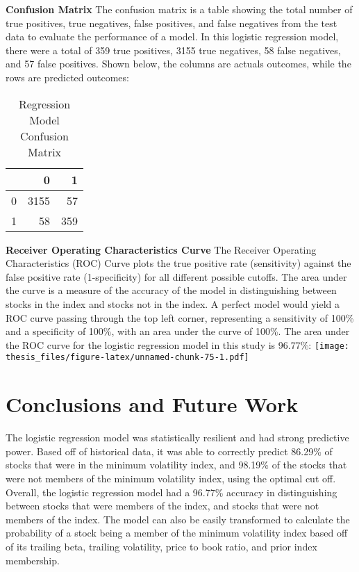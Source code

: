 \documentclass[12pt,twoside]{reedthesis}
\theoremstyle{definition}
\theoremstyle{definition}
\theoremstyle{definition}
\theoremstyle{remark}
\begin{document}
\hfill\break
\textbf{Confusion Matrix} \hfill\break
The confusion matrix is a table showing the total number of true
positives, true negatives, false positives, and false negatives from the
test data to evaluate the performance of a model. In this logistic
regression model, there were a total of 359 true positives, 3155 true
negatives, 58 false negatives, and 57 false positives. Shown below, the
columns are actuals outcomes, while the rows are predicted outcomes:
\begin{longtable}[t]{lrr}
\caption{\label{tab:unnamed-chunk-74}Regression Model Confusion Matrix}\\
\toprule
  & 0 & 1\\
\midrule
0 & 3155 & 57\\
1 & 58 & 359\\
\bottomrule
\end{longtable}
\hfill\break
\textbf{Receiver Operating Characteristics Curve} \hfill\break
The Receiver Operating Characteristics (ROC) Curve plots the true
positive rate (sensitivity) against the false positive rate
(1-specificity) for all different possible cutoffs. The area under the
curve is a measure of the accuracy of the model in distinguishing
between stocks in the index and stocks not in the index. A perfect model
would yield a ROC curve passing through the top left corner,
representing a sensitivity of 100\% and a specificity of 100\%, with an
area under the curve of 100\%. The area under the ROC curve for the
logistic regression model in this study is 96.77\%:
\texttt{[image: thesis\_files/figure-latex/unnamed-chunk-75-1.pdf]}
\hfill\break

\chapter{Conclusions and Future Work}\label{conclusions-and-future-work}

The logistic regression model was statistically resilient and had strong
predictive power. Based off of historical data, it was able to correctly
predict 86.29\% of stocks that were in the minimum volatility index, and
98.19\% of the stocks that were not members of the minimum volatility
index, using the optimal cut off. Overall, the logistic regression model
had a 96.77\% accuracy in distinguishing between stocks that were
members of the index, and stocks that were not members of the index. The
model can also be easily transformed to calculate the probability of a
stock being a member of the minimum volatility index based off of its
trailing beta, trailing volatility, price to book ratio, and prior index
membership.
\end{document}
